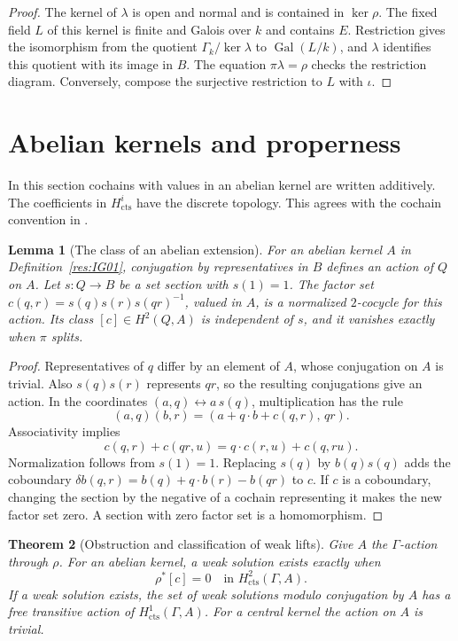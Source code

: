 \documentclass[11pt,oneside,openany]{book}
\newtheorem{theorem}{Theorem}[chapter]
\newtheorem{lemma}[theorem]{Lemma}
\theoremstyle{definition}
\theoremstyle{remark}
\begin{document}
\begin{proof}
The kernel of \(\lambda\) is open and normal and is contained in
\(\ker\rho\). The fixed field \(L\) of this kernel is finite and
Galois over \(k\) and contains \(E\). Restriction gives the
isomorphism from the quotient \(\Gamma_k/\ker\lambda\) to
\(\operatorname{Gal}(L/k)\), and \(\lambda\) identifies this
quotient with its image in \(B\). The equation
\(\pi\lambda=\rho\) checks the restriction diagram. Conversely,
compose the surjective restriction to \(L\) with \(\iota\).
\end{proof}

\section{Abelian kernels and properness}

In this section cochains with values in an abelian kernel are written
additively. The coefficients in \(H^i_{\mathrm{cts}}\) have the
discrete topology. This agrees with the cochain convention in
\cite[Results GC01 and GC04--GC05]{mg-groups}.

\begin{lemma}[The class of an abelian extension]
\label{res:IG03}
For an abelian kernel \(A\) in Definition~\ref{res:IG01}, conjugation
by representatives in \(B\) defines an action of \(Q\) on \(A\).
Let \(s\colon Q\to B\) be a set section with \(s(1)=1\).
The factor set \(c(q,r)=s(q)s(r)s(qr)^{-1}\), valued in \(A\),
is a normalized \(2\)-cocycle for this action. Its class
\([c]\in H^2(Q,A)\) is independent of \(s\), and it vanishes
exactly when \(\pi\) splits.
\end{lemma}

\begin{proof}
Representatives of \(q\) differ by an element of \(A\), whose
conjugation on \(A\) is trivial. Also \(s(q)s(r)\) represents \(qr\),
so the resulting conjugations give an action. In the coordinates
\((a,q)\leftrightarrow a\,s(q)\), multiplication has the rule
\[
 (a,q)(b,r)=(a+q\cdot b+c(q,r),\,qr).
\]
Associativity implies
\[
 c(q,r)+c(qr,u)=q\cdot c(r,u)+c(q,ru).
\]
Normalization follows from \(s(1)=1\). Replacing \(s(q)\) by
\(b(q)s(q)\) adds the coboundary
\(\delta b(q,r)=b(q)+q\cdot b(r)-b(qr)\) to \(c\).
If \(c\) is a coboundary, changing the section by the negative of a
cochain representing it makes the new factor set zero. A section
with zero factor set is a homomorphism.
\end{proof}

\begin{theorem}[Obstruction and classification of weak lifts]
\label{res:IG04}
Give \(A\) the \(\Gamma\)-action through \(\rho\).
For an abelian kernel, a weak solution exists exactly when
\[
        \rho^*[c]=0\quad\text{in }H^2_{\mathrm{cts}}(\Gamma,A).
\]
If a weak solution exists, the set of weak solutions modulo
conjugation by \(A\) has a free transitive action of
\(H^1_{\mathrm{cts}}(\Gamma,A)\).
For a central kernel the action on \(A\) is trivial.
\end{theorem}
\end{document}

